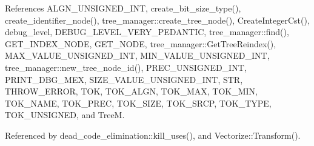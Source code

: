 References A\+L\+G\+N\+\_\+\+U\+N\+S\+I\+G\+N\+E\+D\+\_\+\+I\+NT, create\+\_\+bit\+\_\+size\+\_\+type(), create\+\_\+identifier\+\_\+node(), tree\+\_\+manager\+::create\+\_\+tree\+\_\+node(), Create\+Integer\+Cst(), debug\+\_\+level, D\+E\+B\+U\+G\+\_\+\+L\+E\+V\+E\+L\+\_\+\+V\+E\+R\+Y\+\_\+\+P\+E\+D\+A\+N\+T\+IC, tree\+\_\+manager\+::find(), G\+E\+T\+\_\+\+I\+N\+D\+E\+X\+\_\+\+N\+O\+DE, G\+E\+T\+\_\+\+N\+O\+DE, tree\+\_\+manager\+::\+Get\+Tree\+Reindex(), M\+A\+X\+\_\+\+V\+A\+L\+U\+E\+\_\+\+U\+N\+S\+I\+G\+N\+E\+D\+\_\+\+I\+NT, M\+I\+N\+\_\+\+V\+A\+L\+U\+E\+\_\+\+U\+N\+S\+I\+G\+N\+E\+D\+\_\+\+I\+NT, tree\+\_\+manager\+::new\+\_\+tree\+\_\+node\+\_\+id(), P\+R\+E\+C\+\_\+\+U\+N\+S\+I\+G\+N\+E\+D\+\_\+\+I\+NT, P\+R\+I\+N\+T\+\_\+\+D\+B\+G\+\_\+\+M\+EX, S\+I\+Z\+E\+\_\+\+V\+A\+L\+U\+E\+\_\+\+U\+N\+S\+I\+G\+N\+E\+D\+\_\+\+I\+NT, S\+TR, T\+H\+R\+O\+W\+\_\+\+E\+R\+R\+OR, T\+OK, T\+O\+K\+\_\+\+A\+L\+GN, T\+O\+K\+\_\+\+M\+AX, T\+O\+K\+\_\+\+M\+IN, T\+O\+K\+\_\+\+N\+A\+ME, T\+O\+K\+\_\+\+P\+R\+EC, T\+O\+K\+\_\+\+S\+I\+ZE, T\+O\+K\+\_\+\+S\+R\+CP, T\+O\+K\+\_\+\+T\+Y\+PE, T\+O\+K\+\_\+\+U\+N\+S\+I\+G\+N\+ED, and TreeM.



Referenced by dead\+\_\+code\+\_\+elimination\+::kill\+\_\+uses(), and Vectorize\+::\+Transform().

